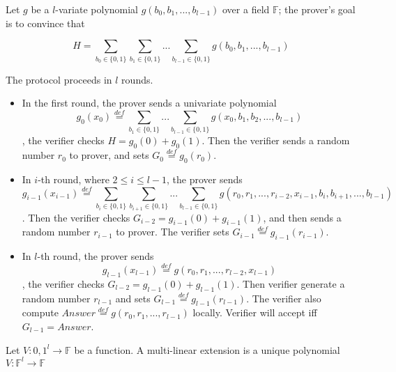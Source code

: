 \begin{definition}
Let $g$ be a $l$-variate polynomial $g(b_0, b_1, ..., b_{l-1})$ over a field $\mathbb{F}$; the prover's goal is to convince that 

$$H=\sum_{b_0\in\{0,1\}}\sum_{b_1\in\{0,1\}}...\sum_{b_{l-1}\in\{0,1\}}g(b_0,b_1,...,b_{l-1})$$
\end{definition}

\begin{protocol}
The protocol proceeds in $l$ rounds. 
\begin{itemize}
\item In the first round, the prover sends a univariate polynomial $$g_0(x_0)\overset{def}{=}\sum_{b_1\in\{0,1\}}...\sum_{b_{l-1}\in\{0,1\}}g(x_0, b_1, b_2, ..., b_{l-1})$$, the verifier checks $H=g_0(0)+g_0(1)$. Then the verifier sends a random number $r_0$ to prover, and sets $G_0\overset{def}{=}g_{0}(r_0)$.
\item In $i$-th round, where $2\le i \le l-1$, the prover sends $$g_{i-1}(x_{i-1})\overset{def}{=}\sum_{b_{i}\in\{0,1\}}\sum_{b_{i+1}\in\{0,1\}}...\sum_{b_{l-1}\in\{0,1\}}g(r_0, r_1, ..., r_{i-2}, x_{i-1}, b_{i}, b_{i+1}, ..., b_{l-1})$$. Then the verifier checks $G_{i-2}=g_{i-1}(0)+g_{i-1}(1)$, and then sends a random number $r_{i-1}$ to prover. The verifier sets $G_{i-1}\overset{def}{=}g_{i-1}(r_{i-1})$.
\item In $l$-th round, the prover sends $$g_{l-1}(x_{l-1})\overset{def}{=}g(r_0, r_1, ..., r_{l-2}, x_{l-1})$$, the verifier checks $G_{l-2}=g_{l-1}(0)+g_{l-1}(1)$. Then verifier generate a random number $r_{l-1}$ and sets $G_{l-1}\overset{def}{=}g_{l-1}(r_{l-1})$. The verifier also compute $Answer\overset{def}{=}g(r_0, r_1, ..., r_{l-1})$ locally. Verifier will accept iff $G_{l-1}=Answer$.
\end{itemize}
\end{protocol}

\begin{definition}
	Let $V:{0, 1}^l \rightarrow \mathbb{F}$ be a function. A multi-linear extension is a unique polynomial $V: \mathbb{F}^l \rightarrow \mathbb{F}$
\end{definition}


